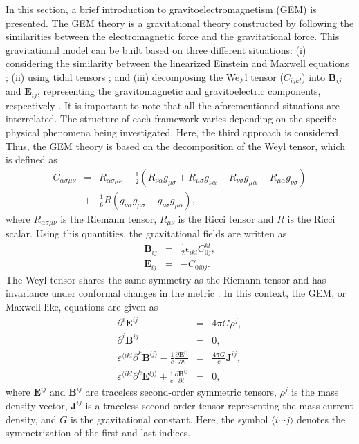 \documentclass[11pt,showpacs,preprintnumbers,amsmath,amssymb,prd,nofootinbib,superscriptaddress]{revtex4-2}
\newcommand{\bea}{\begin{eqnarray}}
\newcommand{\eea}{\end{eqnarray}}
\begin{document}
In this section, a brief introduction to gravitoelectromagnetism (GEM) is presented. The GEM theory is a gravitational theory constructed by following the similarities between the electromagnetic force and the gravitational force. This gravitational model can be built based on three different situations: (i) considering the similarity between the linearized Einstein and Maxwell equations \cite{Mashhon}; (ii) using tidal tensors \cite{Filipe}; and (iii) decomposing the  Weyl tensor  ($C_{ijkl}$) into $\mathbf{B}_{ij}$ and $\mathbf{E}_{ij}$, representing the gravitomagnetic and gravitoelectric components, respectively \cite{Maartens}. It is important to note that all the aforementioned situations are interrelated. The structure of each framework varies depending on the specific physical phenomena being investigated. Here, the third approach is considered. Thus, the GEM theory is based on the decomposition of the Weyl tensor, which is defined as
\bea
C_{\alpha\sigma\mu\nu}&=&R_{\alpha\sigma\mu\nu}-\frac{1}{2}\left(R_{\nu\alpha}g_{\mu\sigma}+R_{\mu\sigma}g_{\nu\alpha}-R_{\nu\sigma}g_{\mu\alpha}-R_{\mu\alpha}g_{\nu\sigma}\right)\nonumber\\
&+&\frac{1}{6}R\left(g_{\nu\alpha}g_{\mu\sigma}-g_{\nu\sigma}g_{\mu\alpha}\right),
\eea
where $R_{\alpha\sigma\mu\nu}$ is the Riemann tensor, $R_{\mu\nu}$ is the Ricci tensor and $R$ is the Ricci scalar. Using this quantities, the gravitational fields are written as
\bea
\mathbf{B}_{ij}&=&\frac{1}{2}\epsilon_{ikl}C^{kl}_{0j},\\
\mathbf{E}_{ij}&=&-C_{0i0j}.
\eea
 The Weyl tensor shares the same symmetry as the Riemann tensor and has invariance under conformal changes in the metric \cite{danehkar2009significance}. In this context, the GEM, or Maxwell-like,  equations are given as
\begin{eqnarray}
    \partial^{i}\mathbf{E}^{ij}&=&4\pi G\rho^j,\label{2.2}\\
    \partial^{i}\mathbf{B}^{ij}&=&0,\label{2.3}\\
    \varepsilon^{\langle ikl}\partial^k \mathbf{B}^{lj\rangle}-\frac{1}{c}\frac{\partial \mathbf{E}^{ij}}{\partial t}&=&\frac{4\pi G}{c}\mathbf{J}^{ij},\label{2.4}\\
    \varepsilon^{\langle ikl}\partial^k \mathbf{E}^{lj\rangle}+\frac{1}{c}\frac{\partial \mathbf{B}^{ij}}{\partial t}&=&0,\label{2.5}
\end{eqnarray}
where $\mathbf{E}^{ij}$ and $\mathbf{B}^{ij}$ are traceless second-order symmetric tensors, $\rho^j$ is the mass density vector, $\mathbf{J}^{ij}$ is a traceless second-order tensor representing the mass current density, and $G$ is the gravitational constant. Here, the symbol $\langle i\cdots j \rangle$ denotes the
symmetrization of the first and last indices.
\end{document}
